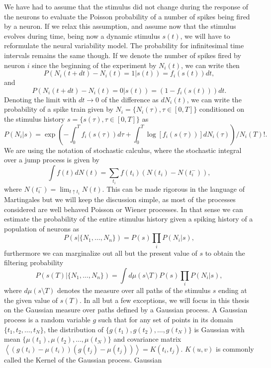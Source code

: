 We have had to assume that the stimulus did not change during the response of the neurons to evaluate the Poisson probability of a number of spikes being fired by a neuron. If we relax this assumption, and assume now that the stimulus evolves during time, being now a dynamic stimulus $s(t)$, we will have to reformulate the neural variability model. The probability for infinitesimal time intervals remains the same though. If we denote the number of spikes fired by neuron $i$ since the beginning of the experiment by $N_i(t)$, we can write then
\[
P(N_i(t+dt) - N_i(t) = 1|s(t)) = f_i\left(s(t)\right) dt,
\]
and 
\[
P(N_i(t+dt) - N_i(t) = 0|s(t)) = (1-f_i\left(s(t)\right)) dt.
\]
Denoting the limit with $dt\to 0$ of the difference as $dN_i(t)$, we can write the probability of a spike train given by $N_i = \{N_i(\tau), \tau \in [0,T]\}$ conditioned on the stimulus history $s = \{s(\tau), \tau \in [0,T]\}$ as
\[
P(N_i|s) = \exp\left(-\int_0^T f_i(s(\tau)) d\tau + \int_0^T \log\left[f_i(s(\tau))\right] dN_i(\tau) \right)/N_i(T)!.
\]
We are using the notation of stochastic calculus, where the stochastic integral over a jump process is given by
\[
\int f(t) dN(t) = \sum_{t_i} f(t_i) (N(t_i) - N(t_i^-)),
\]
where $N(t_i^-) = \lim_{t\uparrow t_i} N(t)$. This can be made rigorous in the language of Martingales but we will keep the discussion simple, as most of the processes
considered are well behaved Poisson or Wiener processes.
In that sense we can estimate the probability of the entire stimulus history given a spiking history of a population of neurons as
\[
P(s|\{N_1,\ldots,N_n\}) = P(s) \prod_i P(N_i|s),
\]
furthermore we can marginalize out all but the present value of $s$ to obtain the filtering probability
\begin{equation}
\label{eq:filtering_eq_path}
P(s(T)|\{N_1,\ldots,N_n\}) = \int d\mu(s\setminus T) P(s) \prod_i P(N_i|s),
\end{equation}
where $d\mu(s\setminus T)$ denotes the measure over all paths of the stimulus $s$ ending at the given value of $s(T)$. In all but a few exceptions, we will focus in
this thesis on the Gaussian measure over paths defined by a Gaussian process. A Gaussian process is a random variable $g$ such that for any set of points in its
domain $\{t_1, t_2, \ldots , t_N\}$, the distribution of $\{g(t_1), g(t_2), \ldots, g(t_N)\}$ is Gaussian with mean $\{\mu(t_1),\mu(t_2),\ldots,\mu(t_N)\}$ and covariance
matrix $\left<\left(g(t_i) - \mu(t_i)\right)\left(g(t_j)-\mu(t_j)\right)\right> = K(t_i,t_j)$. $K(u,v)$ is commonly called the Kernel of the Gaussian process. Gaussian 

